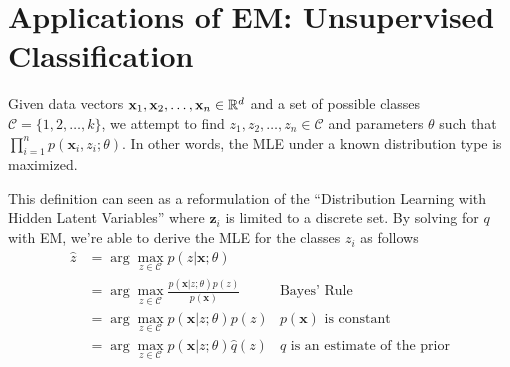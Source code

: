\section{Applications of EM: Unsupervised Classification}
\begin{definition}
    Given data vectors $\mathbf{x}_1,\mathbf{x}_2,\dots,\mathbf{x}_n\in\mathbb{R}^d$ and a set of possible classes $\mathcal{C}=\{1,2,\dots,k\}$, we attempt to find $z_1,z_2,\dots,z_n\in \mathcal{C}$ and parameters $\theta$ such that $\prod_{i=1}^n p(\mathbf{x}_i,z_i;\theta)$. In other words, the MLE under a known distribution type is maximized.
\end{definition}
This definition can seen as a reformulation of the ``Distribution Learning with Hidden Latent Variables'' where $\mathbf{z}_i$ is limited to a discrete set. By solving for $q$ with EM, we're able to derive the MLE for the classes $z_i$ as follows
\begin{align*}
    \hat{z} 
    &= \arg\max_{z\in\mathcal{C}} p(z|\mathbf{x};\theta) \\
    &= \arg\max_{z\in\mathcal{C}} \frac{p(\mathbf{x}|z;\theta)p(z)}{p(\mathbf{x})} & \text{Bayes' Rule}\\
    &= \arg\max_{z\in\mathcal{C}} p(\mathbf{x}|z;\theta)p(z) & p(\mathbf{x})\text{ is constant} \\
    &= \arg\max_{z\in\mathcal{C}} p(\mathbf{x}|z;\theta)\hat{q}(z) & \hat{q}\text{ is an estimate of the prior}
\end{align*}

